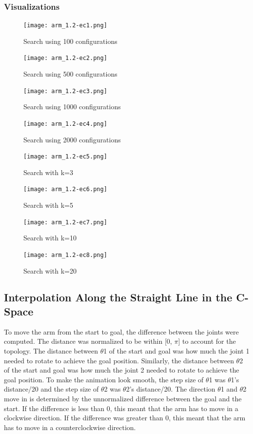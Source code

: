 \documentclass{article}
\begin{document}
\subsubsection{Visualizations}
\begin{figure}[htbp]
  \centering
  \begin{minipage}{0.45\textwidth}
    \texttt{[image: arm\_1.2-ec1.png]}
    \caption{Search using 100 configurations}
  \end{minipage}\hfill
  \begin{minipage}{0.45\textwidth}
    \texttt{[image: arm\_1.2-ec2.png]}
    \caption{Search using 500 configurations}
  \end{minipage}
  \begin{minipage}{0.45\textwidth}
    \texttt{[image: arm\_1.2-ec3.png]}
    \caption{Search using 1000 configurations}
  \end{minipage}\hfill
  \begin{minipage}{0.45\textwidth}
    \texttt{[image: arm\_1.2-ec4.png]}
    \caption{Search using 2000 configurations}
  \end{minipage}
\end{figure}
\begin{figure}[htbp]
  \centering
  \begin{minipage}{0.45\textwidth}
    \texttt{[image: arm\_1.2-ec5.png]}
    \caption{Search with k=3}
  \end{minipage}\hfill
  \begin{minipage}{0.45\textwidth}
    \texttt{[image: arm\_1.2-ec6.png]}
    \caption{Search with k=5}
  \end{minipage}
  \begin{minipage}{0.45\textwidth}
    \texttt{[image: arm\_1.2-ec7.png]}
    \caption{Search with k=10}
  \end{minipage}\hfill
  \begin{minipage}{0.45\textwidth}
    \texttt{[image: arm\_1.2-ec8.png]}
    \caption{Search with k=20}
  \end{minipage}
\end{figure}
\subsection{Interpolation Along the Straight Line in the C-Space}
To move the arm from the start to goal, the difference between the joints were computed. The distance was normalized to be within [0, $\pi$] to account for the topology. The distance between $\theta$1 of the start and goal was how much the joint 1 needed to rotate to achieve the goal position. Similarly, the distance between $\theta$2 of the start and goal was how much the joint 2 needed to rotate to achieve the goal position. To make the animation look smooth, the step size of $\theta$1 was $\theta$1's distance/20 and the step size of $\theta$2 was $\theta$2's distance/20. The direction $\theta$1 and $\theta$2 move in is determined by the unnormalized difference between the goal and the start. If the difference is less than 0, this meant that the arm has to move in a clockwise direction. If the difference was greater than 0, this meant that the arm has to move in a counterclockwise direction.
\end{document}
